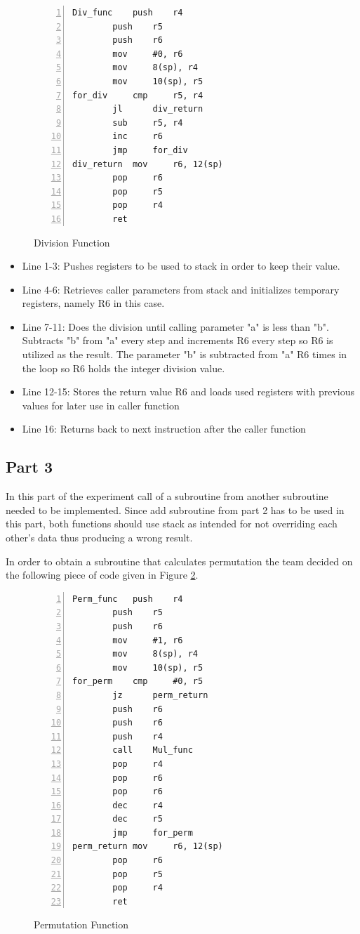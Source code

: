 \documentclass[pdftex,12pt,a4paper]{article}
\begin{document}
\begin{figure}[H]
    \centering
\begin{lstlisting}[language={[x86masm]Assembler}, numbers=left]
Div_func	push	r4
		push	r5
		push	r6
		mov		#0, r6
		mov		8(sp), r4
		mov		10(sp), r5
for_div		cmp		r5, r4
		jl		div_return
		sub		r5, r4
		inc		r6
		jmp		for_div
div_return	mov		r6, 12(sp)
		pop		r6
		pop		r5
		pop		r4
		ret
    \end{lstlisting}
    \label{fig:divFunction}
    \caption{Division Function}
\end{figure}

\begin{itemize}
    \item Line 1-3: Pushes registers to be used to stack in order to keep their value.
    \item Line 4-6: Retrieves caller parameters from stack and initializes temporary registers, namely R6 in this case. 
    \item Line 7-11: Does the division until calling parameter "a" is less than "b". Subtracts "b" from "a" every step and increments R6 every step so R6 is utilized as the result. The parameter "b" is subtracted from "a" R6 times in the loop so R6 holds the integer division value.
    \item Line 12-15: Stores the return value R6 and loads used registers with previous values for later use in caller function
    \item Line 16: Returns back to next instruction after the caller function

\end{itemize}

\newpage
\subsection{Part 3}
In this part of the experiment call of a subroutine from another subroutine needed to be implemented. Since add subroutine from part 2 has to be used in this part, both functions should use stack as intended for not overriding each other's data thus producing a wrong result. 

\newline{}
In order to obtain a subroutine that calculates permutation the team decided on the following piece of code given in Figure \ref{code:permFunc}.

\begin{figure}[H]
    \centering
\begin{lstlisting}[language={[x86masm]Assembler}, numbers=left]
Perm_func	push	r4
		push	r5
		push	r6
		mov		#1, r6
		mov		8(sp), r4
		mov		10(sp), r5
for_perm	cmp		#0, r5
		jz		perm_return
		push	r6
		push	r6
		push	r4
		call	Mul_func
		pop		r4
		pop		r6
		pop		r6
		dec		r4
		dec		r5
		jmp		for_perm
perm_return	mov		r6, 12(sp)
		pop		r6
    	pop		r5
		pop		r4
		ret
\end{lstlisting}
    \caption{Permutation Function}
    \label{code:permFunc}
\end{figure}
\end{document}
